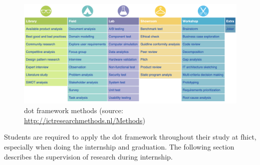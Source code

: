 \begin{figure}[h]
    \centering
    \includegraphics[width=\textwidth]{figures/dot_methods.png}
    \caption{\acrshort{dot} framework methods (source: \url{http://ictresearchmethods.nl/Methods})}
    \label{fig:dot_methods}
\end{figure}

\noindent Students are required to apply the \acrshort{dot} framework throughout their study at \acrshort{fhict}, especially when doing the internship and graduation. The following section describes the supervision of research during internship.